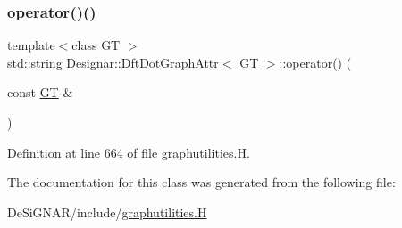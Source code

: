 \subsubsection{\texorpdfstring{operator()()}{operator()()}}
{\footnotesize\ttfamily template$<$class GT $>$ \\
std\+::string \hyperlink{class_designar_1_1_dft_dot_graph_attr}{Designar\+::\+Dft\+Dot\+Graph\+Attr}$<$ \hyperlink{demo-buildgraph_8_c_a3001c40d2c31ca87ed96cd7d1334a55e}{GT} $>$\+::operator() (\begin{DoxyParamCaption}\item[{const \hyperlink{demo-buildgraph_8_c_a3001c40d2c31ca87ed96cd7d1334a55e}{GT} \&}]{ }\end{DoxyParamCaption})\hspace{0.3cm}{\ttfamily [inline]}}



Definition at line 664 of file graphutilities.\+H.



The documentation for this class was generated from the following file\+:\begin{DoxyCompactItemize}
\item 
De\+Si\+G\+N\+A\+R/include/\hyperlink{graphutilities_8_h}{graphutilities.\+H}\end{DoxyCompactItemize}
